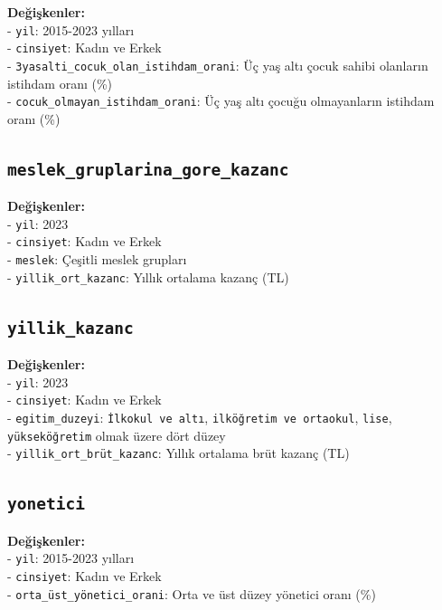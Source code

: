 \documentclass[
  11pt,
  a4paper,
  DIV=11,
  numbers=noendperiod]{scrartcl}
\begin{document}
\textbf{Değişkenler:}\\
- \texttt{yil}: 2015-2023 yılları\\
- \texttt{cinsiyet}: Kadın ve Erkek\\
- \texttt{3yasalti\_cocuk\_olan\_istihdam\_orani}: Üç yaş altı çocuk
sahibi olanların istihdam oranı (\%)\\
- \texttt{cocuk\_olmayan\_istihdam\_orani}: Üç yaş altı çocuğu
olmayanların istihdam oranı (\%)

\subsection{\texorpdfstring{\texttt{meslek\_gruplarina\_gore\_kazanc}}{meslek\_gruplarina\_gore\_kazanc}}\label{meslek_gruplarina_gore_kazanc}

\textbf{Değişkenler:}\\
- \texttt{yil}: 2023\\
- \texttt{cinsiyet}: Kadın ve Erkek\\
- \texttt{meslek}: Çeşitli meslek grupları\\
- \texttt{yillik\_ort\_kazanc}: Yıllık ortalama kazanç (TL)

\subsection{\texorpdfstring{\texttt{yillik\_kazanc}}{yillik\_kazanc}}\label{yillik_kazanc}

\textbf{Değişkenler:}\\
- \texttt{yil}: 2023\\
- \texttt{cinsiyet}: Kadın ve Erkek\\
- \texttt{egitim\_duzeyi}: \texttt{İlkokul\ ve\ altı},
\texttt{ilköğretim\ ve\ ortaokul}, \texttt{lise}, \texttt{yükseköğretim}
olmak üzere dört düzey\\
- \texttt{yillik\_ort\_brüt\_kazanc}: Yıllık ortalama brüt kazanç (TL)

\subsection{\texorpdfstring{\texttt{yonetici}}{yonetici}}\label{yonetici}

\textbf{Değişkenler:}\\
- \texttt{yil}: 2015-2023 yılları\\
- \texttt{cinsiyet}: Kadın ve Erkek\\
- \texttt{orta\_üst\_yönetici\_orani}: Orta ve üst düzey yönetici oranı
(\%)
\end{document}
